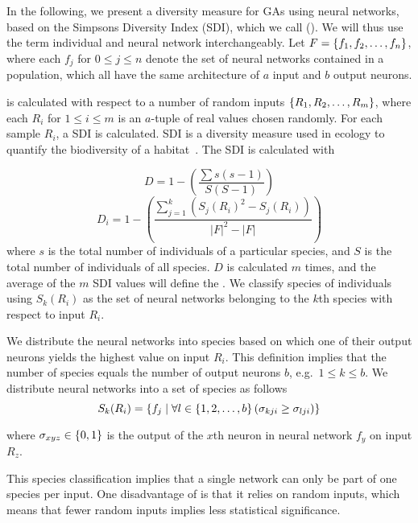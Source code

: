 \section{\di{}}
In the following, we present a diversity measure for GAs using neural networks, based on the Simpsons Diversity Index (SDI), which we call \di{} (\dia{}). We will thus use the term individual and neural network interchangeably. Let $F = \left\{ f_1, f_2, \dots, f_n \right\}$, where each $f_j$ for $0 \leq j \leq n$ denote the set of neural networks contained in a population, which all have the same architecture of $a$ input and $b$ output neurons. 

\di{} is calculated with respect to a number of random inputs $\left\{ R_1, R_2, \dots, R_m \right\}$, where each $R_i$ for $1 \leq i \leq m$ is an $a$-tuple of real values chosen randomly. For each sample $R_i$, a SDI is calculated. SDI is a diversity measure used in ecology to quantify the biodiversity of a habitat~\cite{simpson1949measurement}. The SDI is calculated with

\begin{equation*}\label{eq:sdi}
  D = 1 - \left(\frac{\sum{s (s - 1)}}{S (S - 1)}\right) 
\end{equation*}
%
\begin{equation*}\label{eq:sdi2}
  D_i = 1 - \left(\frac{\sum_{j=1}^{k}\left(S_j\left(R_i\right)^2 - S_j(R_i)\right)}{\lvert F\rvert^2 - \lvert F\rvert}\right) 
\end{equation*}
%
where $s$ is the total number of individuals of a particular species, and $S$ is the total number of individuals of all species. $D$ is calculated $m$ times, and the average of the $m$ SDI values will define the \dia{}. We classify species of individuals using $S_k(R_i)$ as the set of neural networks belonging to the $k$th species with respect to input $R_i$.

We distribute the neural networks into species based on which one of their output neurons yields the highest value on input $R_i$. %
This definition implies that the number of species equals the number of output neurons $b$, e.g.\ $1 \leq k \leq b$. We distribute neural networks into a set of species as follows
%
\begin{equation*}\label{eq:species}
  S_k(R_i) = \left\{ f_j \mid \forall l \in \left\{ 1, 2, \dots, b \right\} \left(\sigma_{kji} \geq \sigma_{lji}\right) \right\}
\end{equation*}
%

where $\sigma_{xyz} \in \left\{ 0, 1 \right\}$ is the output of the $x$th neuron in neural network $f_y$ on input $R_z$.

This species classification implies that a single network can only be part of one species per input. One disadvantage of \dia{} is that it relies on random inputs, which means that fewer random inputs implies less statistical significance.
